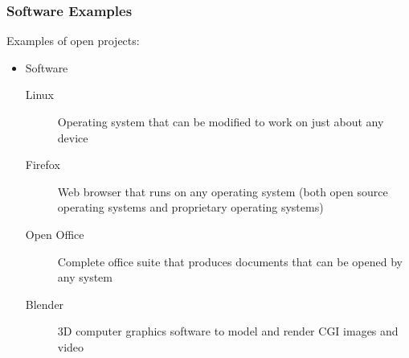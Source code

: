 \documentclass{beamer}
\begin{document}
\begin{frame}
  \frametitle{Software Examples}
  Examples of open projects:

  \begin{itemize}
  \item Software
    \begin{description}
    \item[Linux] Operating system that can be modified to work on just
      about any device
    \item[Firefox] Web browser that runs on any operating system (both
      open source operating systems and proprietary operating systems)
    \item[Open Office] Complete office suite that produces documents
      that can be opened by any system
    \item[Blender] 3D computer graphics software to model and render CGI images and video
    \end{description}
    \end{itemize}
\end{frame}
\end{document}
